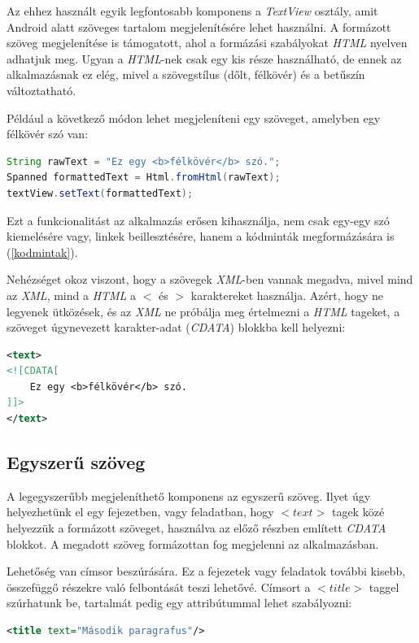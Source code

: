 \documentclass[12pt,a4paper]{article}
\newcommand{\xml}{\textit{XML}\xspace}
\begin{document}
	Az ehhez használt egyik legfontosabb komponens a \textit{TextView} osztály, amit Android alatt szöveges tartalom megjelenítésére lehet használni. A formázott szöveg megjelenítése is támogatott, ahol a formázási szabályokat \textit{HTML} nyelven adhatjuk meg. Ugyan a \textit{HTML}-nek csak egy kis része használható, de ennek az alkalmazásnak ez elég, mivel a szövegstílus (dőlt, félkövér) és a betűszín változtatható.
	
	Például a következő módon lehet megjeleníteni egy szöveget, amelyben egy félkövér szó van:
	
	\bigskip
	\begin{lstlisting}[language=Java]
String rawText = "Ez egy <b>félkövér</b> szó.";
Spanned formattedText = Html.fromHtml(rawText);
textView.setText(formattedText);
	\end{lstlisting}
	\bigskip
	
	Ezt a funkcionalitást az alkalmazás erősen kihasználja, nem csak egy-egy szó kiemelésére vagy, linkek beillesztésére, hanem a kódminták megformázására is (\ref{kodmintak}).
	
	Nehézséget okoz viszont, hogy a szövegek \xml-ben vannak megadva, mivel mind az \xml, mind a \textit{HTML} a $<$ és $>$ karaktereket használja. Azért, hogy ne legyenek ütközések, és az \xml ne próbálja meg értelmezni a \textit{HTML} tageket, a szöveget úgynevezett karakter-adat (\textit{CDATA}) blokkba kell helyezni:
	
	\bigskip
	\begin{lstlisting}[language=XML]
<text>
<![CDATA[
	Ez egy <b>félkövér</b> szó.
]]>
</text>
	\end{lstlisting}
	
	\subsection{Egyszerű szöveg}
	
	A legegyszerűbb megjeleníthető komponens az egyszerű szöveg. Ilyet úgy helyezhetünk el egy fejezetben, vagy feladatban, hogy $<text>$ tagek közé helyezzük a formázott szöveget, használva az előző részben említett \textit{CDATA} blokkot. A megadott szöveg formázottan fog megjelenni az alkalmazásban.
	
	Lehetőség van címsor beszúrására. Ez a fejezetek vagy feladatok további kisebb, összefüggő részekre való felbontását teszi lehetővé. Címsort a $<title>$ taggel szúrhatunk be, tartalmát pedig egy attribútummal lehet szabályozni:
	
	\bigskip
	\begin{lstlisting}[language=XML]
<title text="Második paragrafus"/>
	\end{lstlisting}
	\bigskip
	
\end{document}
